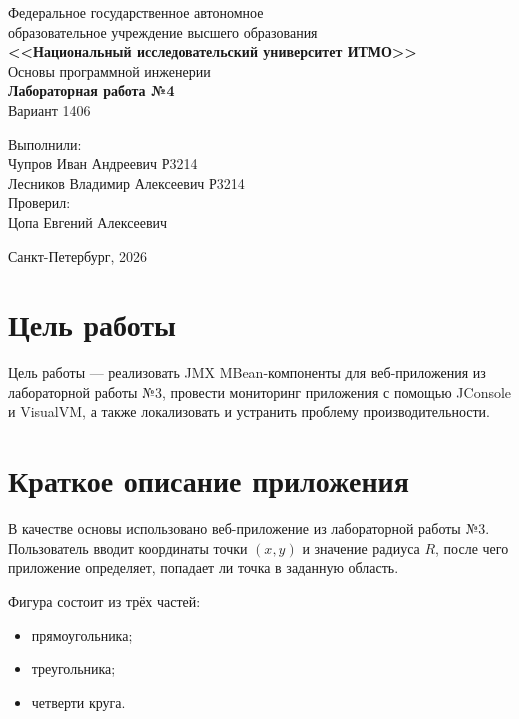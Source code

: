\documentclass[a4paper,11pt]{article}
\begin{document}
\begin{titlepage}
    \centering
    Федеральное государственное автономное \\
    образовательное учреждение высшего образования \\
    \textbf{<<Национальный исследовательский университет ИТМО>>} \\

    \vfill
    Основы программной инженерии \\
    \vspace{0.5\baselineskip}
    \textbf{Лабораторная работа №4} \\
    \vspace{0.5\baselineskip}
    Вариант 1406 \\
    \vfill

    \flushright
    Выполнили:\\
    Чупров Иван Андреевич Р3214 \\
    Лесников Владимир Алексеевич Р3214 \\
    \vspace{0.5\baselineskip}
    Проверил:\\
    Цопа Евгений Алексеевич

    \vspace{3\baselineskip}

    \centering
    Санкт-Петербург, 2026
\end{titlepage}

\tableofcontents
\newpage

\section{Цель работы}

Цель работы --- реализовать JMX MBean-компоненты для веб-приложения из лабораторной работы №3, провести мониторинг приложения с помощью JConsole и VisualVM, а также локализовать и устранить проблему производительности.

\section{Краткое описание приложения}

В качестве основы использовано веб-приложение из лабораторной работы №3. Пользователь вводит координаты точки $(x, y)$ и значение радиуса $R$, после чего приложение определяет, попадает ли точка в заданную область.

Фигура состоит из трёх частей:
\begin{itemize}
    \item прямоугольника;
    \item треугольника;
    \item четверти круга.
\end{itemize}
\end{document}
